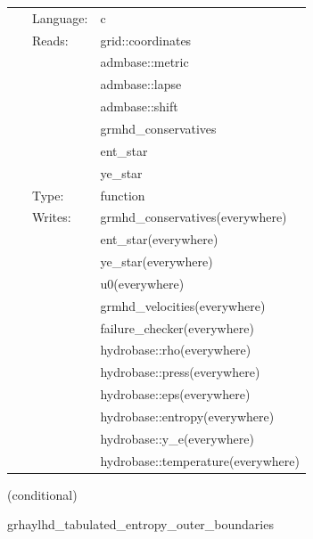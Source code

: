 \documentclass{article}
\begin{document}
 \begin{tabular*}{160mm}{cll} 
~ & Language:  & c \\ 
~ & Reads:  & grid::coordinates \\ 
~& ~ &admbase::metric\\ 
~& ~ &admbase::lapse\\ 
~& ~ &admbase::shift\\ 
~& ~ &grmhd\_conservatives\\ 
~& ~ &ent\_star\\ 
~& ~ &ye\_star\\ 
~ & Type:  & function \\ 
~ & Writes:  & grmhd\_conservatives(everywhere) \\ 
~& ~ &ent\_star(everywhere)\\ 
~& ~ &ye\_star(everywhere)\\ 
~& ~ &u0(everywhere)\\ 
~& ~ &grmhd\_velocities(everywhere)\\ 
~& ~ &failure\_checker(everywhere)\\ 
~& ~ &hydrobase::rho(everywhere)\\ 
~& ~ &hydrobase::press(everywhere)\\ 
~& ~ &hydrobase::eps(everywhere)\\ 
~& ~ &hydrobase::entropy(everywhere)\\ 
~& ~ &hydrobase::y\_e(everywhere)\\ 
~& ~ &hydrobase::temperature(everywhere)\\ 
\end{tabular*} 


\vspace{5mm}

   (conditional) 

\hspace{5mm} grhaylhd\_tabulated\_entropy\_outer\_boundaries 

\hspace{5mm}{\it entropy+tabulated version of grhaylhd\_outer\_boundaries } 


\hspace{5mm}
\end{document}
